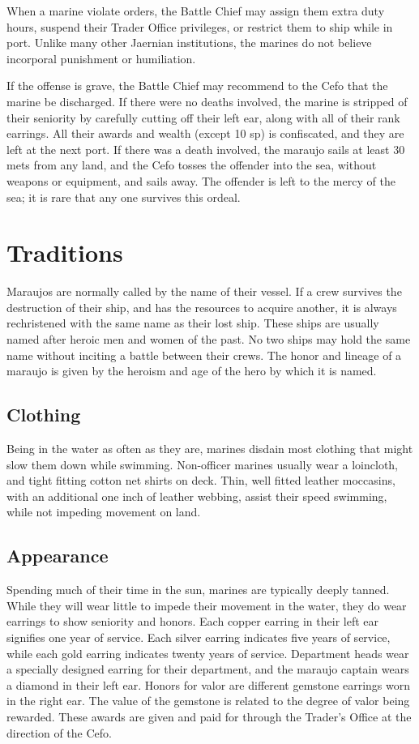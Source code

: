 \begin{multicols*}{2}
When a marine violate orders, the Battle Chief may assign them extra duty hours, suspend their Trader Office privileges, or restrict them to ship while in port. Unlike many other Jaernian institutions, the marines do not believe incorporal punishment or humiliation.

If the offense is grave, the Battle Chief may recommend to the Cefo that the marine be discharged. If there were no deaths involved, the marine is stripped of their seniority by carefully cutting off their left ear, along with all of their rank earrings. All their awards and wealth (except 10 sp) is confiscated, and they are left at the next port. If there was a death involved, the maraujo sails at least 30 mets from any land, and the Cefo tosses the offender into the sea, without weapons or equipment, and sails away. The offender is left to the mercy of the sea; it is rare that any one survives this ordeal.

\section{Traditions}

Maraujos are normally called by the name of their vessel. If a crew survives the destruction of their ship, and has the resources to acquire another, it is always rechristened with the same name as their lost ship. These ships are usually named after heroic men and women of the past. No two ships may hold the same name without inciting a battle between their crews. The honor and lineage of a maraujo is given by the heroism and age of the hero by which it is named.

\subsection{Clothing}

Being in the water as often as they are, marines disdain most clothing that might slow them down while swimming. Non-officer marines usually wear a loincloth, and tight fitting cotton net shirts on deck. Thin, well fitted leather moccasins, with an additional one inch of leather webbing,
assist their speed swimming, while not impeding movement on land.

\subsection{Appearance}

Spending much of their time in the sun, marines are typically deeply tanned. While they will wear little to impede their movement in the water, they do wear earrings to show seniority and honors. Each copper earring in their left ear signifies one year of service. Each silver earring indicates five years of service, while each gold earring indicates twenty years of service. Department heads wear a specially designed earring for their department, and the maraujo captain wears a diamond in their left ear. Honors for valor are different gemstone earrings worn in the right ear. The value of the gemstone is related to the degree of valor being rewarded. These awards are given and paid for through the Trader’s Office at the direction of the Cefo.


\end{multicols*}
